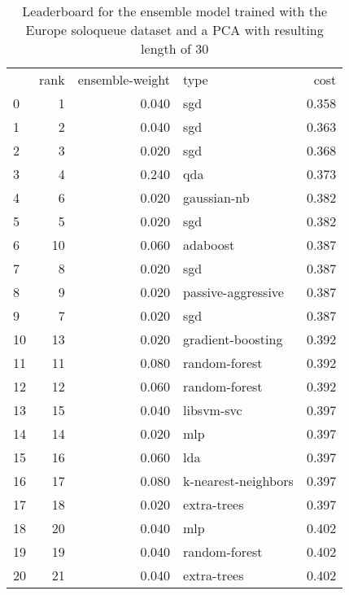     \begin{table}[]
        \centering
        \begin{tabular}{lrrlr}
 & rank & ensemble-weight & type & cost \\
0 & 1 & 0.040 & sgd & 0.358 \\
1 & 2 & 0.040 & sgd & 0.363 \\
2 & 3 & 0.020 & sgd & 0.368 \\
3 & 4 & 0.240 & qda & 0.373 \\
4 & 6 & 0.020 & gaussian-nb & 0.382 \\
5 & 5 & 0.020 & sgd & 0.382 \\
6 & 10 & 0.060 & adaboost & 0.387 \\
7 & 8 & 0.020 & sgd & 0.387 \\
8 & 9 & 0.020 & passive-aggressive & 0.387 \\
9 & 7 & 0.020 & sgd & 0.387 \\
10 & 13 & 0.020 & gradient-boosting & 0.392 \\
11 & 11 & 0.080 & random-forest & 0.392 \\
12 & 12 & 0.060 & random-forest & 0.392 \\
13 & 15 & 0.040 & libsvm-svc & 0.397 \\
14 & 14 & 0.020 & mlp & 0.397 \\
15 & 16 & 0.060 & lda & 0.397 \\
16 & 17 & 0.080 & k-nearest-neighbors & 0.397 \\
17 & 18 & 0.020 & extra-trees & 0.397 \\
18 & 20 & 0.040 & mlp & 0.402 \\
19 & 19 & 0.040 & random-forest & 0.402 \\
20 & 21 & 0.040 & extra-trees & 0.402 \\
\end{tabular}

        \caption{Leaderboard for the ensemble model trained with the Europe soloqueue dataset and a PCA with resulting length of 30}
        \label{tab:lb_europe_games_full_PCA_30}
    \end{table}

